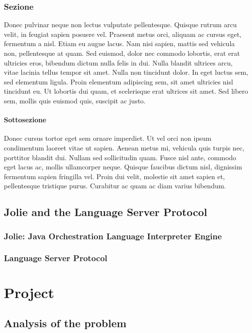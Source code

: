 \documentclass[target=bach]{thud}[2019/10/17]
\begin{document}
\section{Sezione}
Donec pulvinar neque non lectus vulputate pellentesque. Quisque rutrum arcu velit, in feugiat sapien posuere vel. Praesent metus orci, aliquam ac cursus eget, fermentum a nisl. Etiam eu augue lacus. Nam nisi sapien, mattis sed vehicula non, pellentesque at quam. Sed euismod, dolor nec commodo lobortis, erat erat ultricies eros, bibendum dictum nulla felis in dui. Nulla blandit ultrices arcu, vitae lacinia tellus tempor sit amet. Nulla non tincidunt dolor. In eget luctus sem, sed elementum ligula. Proin elementum adipiscing sem, sit amet ultricies nisl tincidunt eu. Ut lobortis dui quam, et scelerisque erat ultrices sit amet. Sed libero sem, mollis quis euismod quis, suscipit ac justo.

\subsection{Sottosezione}
Donec cursus tortor eget sem ornare imperdiet. Ut vel orci non ipsum condimentum laoreet vitae ut sapien. Aenean metus mi, vehicula quis turpis nec, porttitor blandit dui. Nullam sed sollicitudin quam. Fusce nisl ante, commodo eget lacus ac, mollis ullamcorper neque. Quisque faucibus dictum nisl, dignissim fermentum sapien fringilla vel. Proin dui velit, molestie sit amet sapien et, pellentesque tristique purus. Curabitur ac quam ac diam varius bibendum.

\chapter{Jolie and the Language Server Protocol}
\section{Jolie: Java Orchestration Language Interpreter Engine}
\section{Language Server Protocol}

\part{Project}

\chapter{Analysis of the problem}
\end{document}

